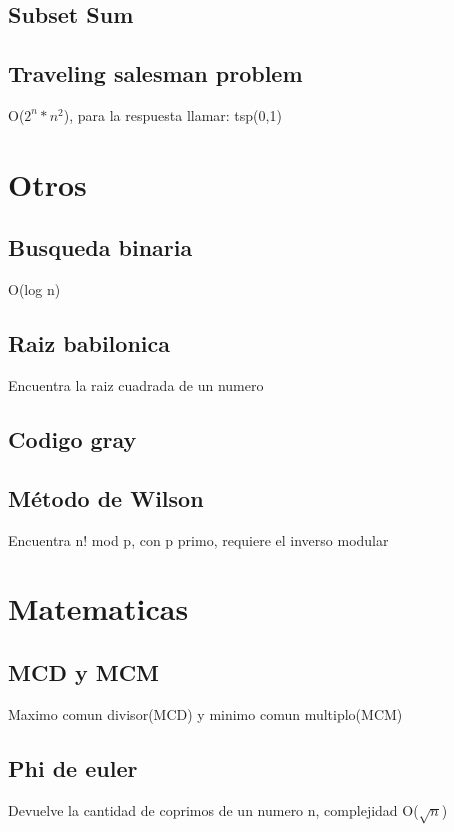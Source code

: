 \documentclass[10pt,landscape,twocolumn,letterpaper,twosided]{article}
\newcommand\cppfile[2][]{

}
\begin{document}
			\subsection{Subset Sum}
			\cppfile[8-20]{programacion_dinamica/Subset_Sum.cpp}
			\subsection{Traveling salesman problem}
			O($2^{n}*n^{2}$), para la respuesta llamar: tsp(0,1)
			\cppfile[7-22]{programacion_dinamica/traveling_salesman_problem.cpp}
		
		\section{Otros}
			\subsection{Busqueda binaria}
			O(log n)
			\cppfile[7-19]{otros/busqueda_binaria.cpp}
			\subsection{Raiz babilonica}
			Encuentra la raiz cuadrada de un numero
			\cppfile[4-12]{otros/raiz_babilonica.cpp}
			\subsection{Codigo gray}
			\cppfile[5-12]{otros/codigo_gray.cpp}
			\subsection{Método de Wilson}
			Encuentra n! mod p, con p primo, requiere el inverso modular
			\cppfile[23-30]{otros/teorema_wilson.cpp}
			
		\section{Matematicas}
			\subsection{MCD y MCM}
			Maximo comun divisor(MCD) y minimo comun multiplo(MCM)
			\cppfile[5-6]{matematicas/MCD_y_MCM.cpp}
			\subsection{Phi de euler}
			Devuelve la cantidad de coprimos de un numero n, complejidad O($\sqrt{n}$) 
			\cppfile[5-14]{matematicas/phi_de_euler.cpp}
\end{document}
